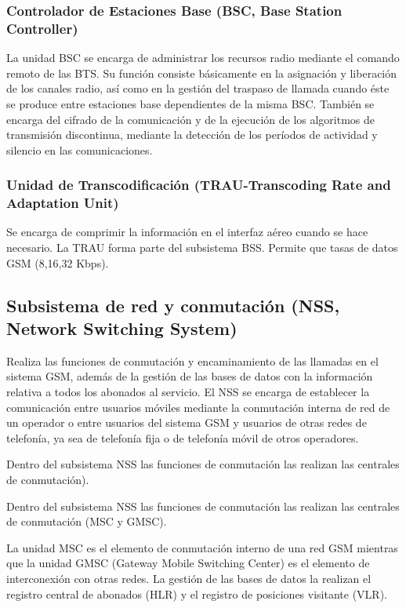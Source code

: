 \subsubsection{Controlador de Estaciones Base (BSC, Base Station Controller)}
\label{sec:bsc}
La unidad BSC se encarga de administrar los recursos radio mediante el comando remoto de las BTS.
Su funci\'on consiste b\'asicamente en la asignaci\'on y liberaci\'on de los canales radio, as\'i como en la gesti\'on del traspaso de llamada cuando \'este se produce entre estaciones base dependientes de la misma BSC. Tambi\'en se encarga del cifrado de la comunicaci\'on y de la ejecuci\'on de los algoritmos de transmisi\'on discontinua, mediante la detecci\'on de los per\'iodos de actividad y silencio en las comunicaciones.

\subsubsection{Unidad de Transcodificaci\'on (TRAU-Transcoding Rate and Adaptation Unit)}
Se encarga de comprimir la informaci\'on en el interfaz a\'ereo cuando se hace necesario. La TRAU forma parte del subsistema BSS. Permite que tasas de datos GSM (8,16,32 Kbps).

\subsection{Subsistema de red y conmutaci\'on (NSS, Network Switching System)}
Realiza las funciones de conmutaci\'on y encaminamiento de las llamadas en el sistema GSM, adem\'as de la gesti\'on de las bases de datos con la informaci\'on relativa a todos los abonados al servicio. El NSS se encarga de establecer la comunicaci\'on entre usuarios m\'oviles mediante la conmutaci\'on interna de red de un operador o entre usuarios del sistema GSM y usuarios de otras redes de telefon\'ia, ya sea de telefon\'ia fija o de telefon\'ia m\'ovil de otros operadores.

Dentro del subsistema NSS las funciones de conmutaci\'on las realizan las centrales de conmutaci\'on).

Dentro del subsistema NSS las funciones de conmutaci\'on las realizan las centrales de conmutaci\'on (MSC y GMSC). 

La unidad MSC es el elemento de conmutaci\'on interno de una red GSM mientras que la unidad GMSC (Gateway Mobile Switching Center) es el elemento de interconexi\'on con otras redes. La gesti\'on de las bases de datos la realizan el registro central de abonados (HLR) y el registro de posiciones visitante (VLR).

